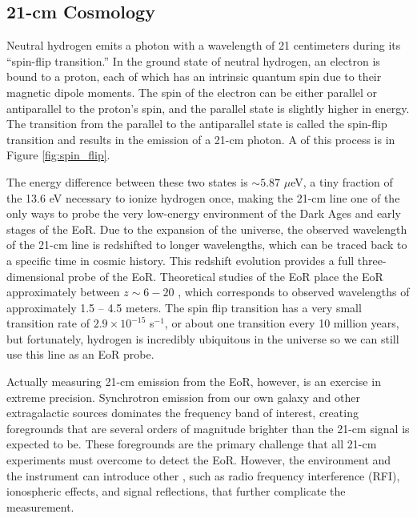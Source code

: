 \documentclass[12pt]{article}
\begin{document}
\subsection{21-cm Cosmology} \label{subsec:21cm}

Neutral hydrogen emits a photon with a wavelength of 21 centimeters during its ``spin-flip transition.'' In the ground state of neutral hydrogen, an electron is bound to a proton, each of which has an intrinsic quantum spin due to their magnetic dipole moments. The spin of the electron can be either parallel or antiparallel to the proton's spin, and the parallel state is slightly higher in energy. The transition from the parallel to the antiparallel state is called the spin-flip transition and results in the emission of a 21-cm photon. A  of this process is in Figure \ref{fig:spin_flip}.

The energy difference between these two states is $\sim 5.87$ $\mu$eV, a tiny fraction of the 13.6 eV necessary to ionize hydrogen once, making the 21-cm line one of the only ways to probe the very low-energy environment of the Dark Ages and early stages of the EoR. Due to the expansion of the universe, the observed wavelength of the 21-cm line is redshifted to longer wavelengths, which can be traced back to a specific time in cosmic history. This redshift evolution provides a full three-dimensional probe of the EoR. Theoretical studies of the EoR place the EoR approximately between $z \sim 6 - 20$ , which corresponds to observed wavelengths of approximately 1.5 -- 4.5 meters. The spin flip transition has a very small transition rate of $2.9 \times 10^{-15}$ s$^{-1}$, or about one transition every 10 million years, but fortunately, hydrogen is incredibly ubiquitous in the universe so we can still use this line as an EoR probe.


Actually measuring 21-cm emission from the EoR, however, is an exercise in extreme precision. Synchrotron emission from our own galaxy and other extragalactic sources dominates the frequency band of interest, creating foregrounds that are several orders of magnitude brighter than the 21-cm signal is expected to be. These foregrounds are the primary challenge that all 21-cm experiments must overcome to detect the EoR. However, the environment and the instrument can introduce other , such as radio frequency interference (RFI), ionospheric effects, and signal reflections, that further complicate the measurement.
\end{document}
